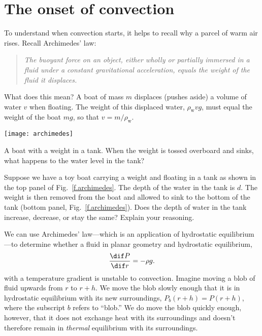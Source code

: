 \section{The onset of convection}\label{s.convection-onset}

To understand when convection starts, it helps to recall why a parcel of warm air rises. Recall Archimedes' law:
\begin{quote}\itshape
The buoyant force on an object, either wholly or partially immersed in a fluid under a constant gravitational acceleration, equals the weight of the fluid it displaces.
\end{quote}
What does this mean? A boat of mass $m$ displaces (pushes aside) a volume of water $v$ when floating. The weight of this displaced water, $\rho_{\mathrm{w}}v g$, must equal the weight of the boat $mg$, so that $v = m/\rho_{\mathrm{w}}$.

\begin{marginfigure}
\texttt{[image: archimedes]}
\caption[A boat with a weight]{\label{f.archimedes} A boat with a weight in a tank. When the weight is tossed overboard and sinks, what happens to the water level in the tank?}
\end{marginfigure}
\begin{exercisebox}
Suppose we have a toy boat carrying a weight and floating in a tank as shown in the top panel of Fig.~\ref{f.archimedes}. The depth of the water in the tank is $d$. The weight is then removed from the boat and allowed to sink to the bottom of the tank (bottom panel, Fig.~\ref{f.archimedes}). Does the depth of water in the tank increase, decrease, or stay the same? Explain your reasoning.
\end{exercisebox}

We can use Archimedes' law---which is an application of hydrostatic equilibrium---to determine whether a fluid in planar geometry and hydrostatic equilibrium,
\begin{equation}
\frac{\dif P}{\dif r} = -\rho g.
\end{equation}
with a temperature gradient is unstable to convection. Imagine moving a blob of fluid upwards from $r$ to $r+h$.  We move the blob slowly enough that it is in hydrostatic equilibrium with its new surroundings, $P_{b}(r+h) = P(r+h)$, where the subscript $b$ refers to ``blob.'' We do move the blob quickly enough, however, that it does not exchange heat with its surroundings and doesn't therefore remain in \emph{thermal} equilibrium with its surroundings. 

